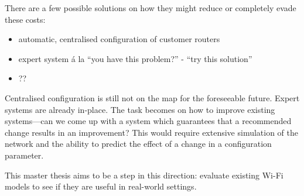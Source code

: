 There are a few possible solutions on how they might reduce or completely evade these costs:

\begin{itemize}
    \item automatic, centralised configuration of customer routers
    \item expert system á la ``you have this problem?'' - ``try this solution''
    \item ??
\end{itemize}


Centralised configuration is still not on the map for the foreseeable future. Expert systems are already in-place. The task becomes on how to improve existing systems---can we come up with a system which guarantees that a recommended change results in an improvement? This would require extensive simulation of the network and the ability to predict the effect of a change in a configuration parameter.

This master thesis aims to be a step in this direction: evaluate existing Wi-Fi models to see if they are useful in real-world settings.














